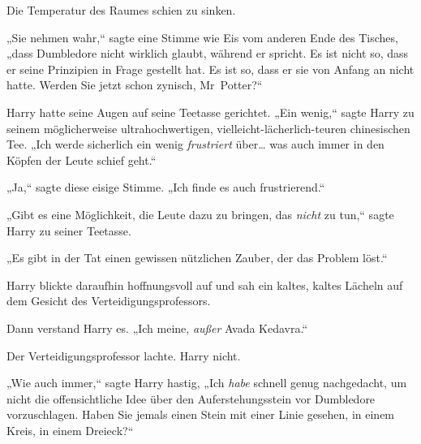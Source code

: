 Die Temperatur des Raumes schien zu sinken.

„Sie nehmen wahr,“ sagte eine Stimme wie Eis vom anderen Ende des Tisches, „dass Dumbledore nicht wirklich glaubt, während er spricht. Es ist nicht so, dass er seine Prinzipien in Frage gestellt hat. Es ist so, dass er sie von Anfang an nicht hatte. Werden Sie jetzt schon zynisch, Mr~Potter?“

Harry hatte seine Augen auf seine Teetasse gerichtet. „Ein wenig,“ sagte Harry zu seinem möglicherweise ultrahochwertigen, vielleicht-lächerlich-teuren chinesischen Tee. „Ich werde sicherlich ein wenig \emph{frustriert} über… was auch immer in den Köpfen der Leute schief geht.“

„Ja,“ sagte diese eisige Stimme. „Ich finde es auch frustrierend.“

„Gibt es eine Möglichkeit, die Leute dazu zu bringen, das \emph{nicht} zu tun,“ sagte Harry zu seiner Teetasse.

„Es gibt in der Tat einen gewissen nützlichen Zauber, der das Problem löst.“

Harry blickte daraufhin hoffnungsvoll auf und sah ein kaltes, kaltes Lächeln auf dem Gesicht des Verteidigungsprofessors.

Dann verstand Harry es. „Ich meine, \emph{außer} Avada Kedavra.“

Der Verteidigungsprofessor lachte. Harry nicht.

„Wie auch immer,“ sagte Harry hastig, „Ich \emph{habe} schnell genug nachgedacht, um nicht die offensichtliche Idee über den Auferstehungsstein vor Dumbledore vorzuschlagen. Haben Sie jemals einen Stein mit einer Linie gesehen, in einem Kreis, in einem Dreieck?“

